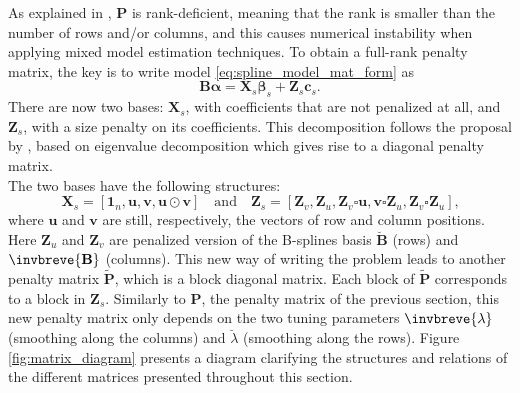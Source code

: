 As explained in \textcite{rodriguez-alvarez_spatial_2016}, $\mathbf{P}$ is rank-deficient, meaning that the rank is smaller than the 
number of rows and/or columns, and this causes numerical instability when applying mixed model estimation techniques. To obtain 
a full-rank penalty matrix, the key is to write model \ref{eq:spline_model_mat_form} as 
\begin{equation}
    \mathbf{B}\boldsymbol{\alpha} = \boldsymbol{X}_{s} \boldsymbol{\beta}_{s}+\boldsymbol{Z}_{s} \boldsymbol{c}_{s}
    \text{.}
\end{equation}
There are now two bases: $\mathbf{X}_{s}$, with coefficients that are not penalized at all, and $\mathbf{Z}_{s}$, with a size 
penalty on its coefficients. This decomposition follows the proposal by \textcite{lee_p-spline_2011}, based on eigenvalue 
decomposition which gives rise to a diagonal penalty matrix.\\
The two bases have the following structures:
\begin{equation}
    \boldsymbol{X}_{s}=\left[\mathbf{1}_{n}, \boldsymbol{u}, \boldsymbol{v}, \boldsymbol{u} \odot \boldsymbol{v}\right]
    \quad
    \text{and}
    \quad
    \mathbf{Z}_{s}=\left[\mathbf{Z}_{v}, \mathbf{Z}_{u}, \mathbf{Z}_{v} \square \mathbf{u}, \mathbf{v} \square \mathbf{Z}_{u}, 
    \mathbf{Z}_{v} \square \mathbf{Z}_{u}\right]
    \text{,}
    \label{eq:detail_Xs_Zs_matrices}
\end{equation}
where $\boldsymbol{u}$ and $\boldsymbol{v}$ are still, respectively, the vectors of row and column positions. 
Here $\mathbf{Z}_{u}$ and $\mathbf{Z}_{v}$ are penalized version of the B-splines basis $\breve{\mathbf{B}}$ (rows) and
$\invbreve{\mathbf{B}}$ (columns). This new way of writing the problem leads to another penalty matrix 
$ \widetilde{\boldsymbol{P}}$, which is a block diagonal matrix. Each block of $ \widetilde{\boldsymbol{P}}$ corresponds to a 
block in $\mathbf{Z}_{s}$. Similarly to $\boldsymbol{P}$, the penalty matrix of the previous section, this new penalty matrix 
only depends on the two tuning parameters $\invbreve{\lambda}$ (smoothing along the columns) and $\breve{\lambda}$ (smoothing 
along the rows).
Figure \ref{fig:matrix_diagram} presents a diagram clarifying the structures and relations of the different matrices presented 
throughout this section.

